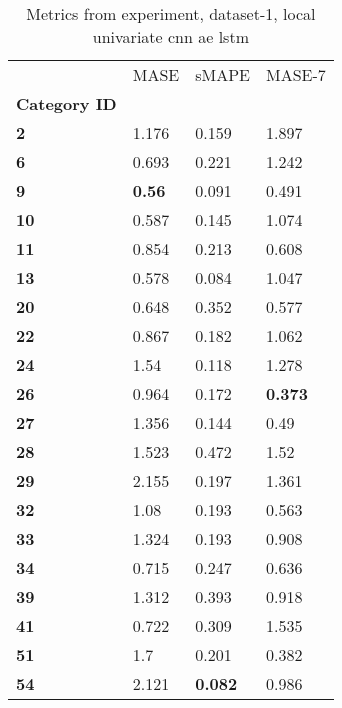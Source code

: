\begin{table}[H]
\centering
\caption{Metrics from experiment, dataset-1, local univariate cnn ae lstm}
\label{table:local-univariate-cnn-ae-lstm-dataset-1}
\begin{tabular}{llll}
\toprule
{} &           MASE &           sMAPE &          MASE-7 \\
\textbf{Category ID} &                &                 &                 \\
\midrule
\textbf{2          } &          1.176 &           0.159 &           1.897 \\
\textbf{6          } &          0.693 &           0.221 &           1.242 \\
\textbf{9          } &  \textbf{0.56} &           0.091 &           0.491 \\
\textbf{10         } &          0.587 &           0.145 &           1.074 \\
\textbf{11         } &          0.854 &           0.213 &           0.608 \\
\textbf{13         } &          0.578 &           0.084 &           1.047 \\
\textbf{20         } &          0.648 &           0.352 &           0.577 \\
\textbf{22         } &          0.867 &           0.182 &           1.062 \\
\textbf{24         } &           1.54 &           0.118 &           1.278 \\
\textbf{26         } &          0.964 &           0.172 &  \textbf{0.373} \\
\textbf{27         } &          1.356 &           0.144 &            0.49 \\
\textbf{28         } &          1.523 &           0.472 &            1.52 \\
\textbf{29         } &          2.155 &           0.197 &           1.361 \\
\textbf{32         } &           1.08 &           0.193 &           0.563 \\
\textbf{33         } &          1.324 &           0.193 &           0.908 \\
\textbf{34         } &          0.715 &           0.247 &           0.636 \\
\textbf{39         } &          1.312 &           0.393 &           0.918 \\
\textbf{41         } &          0.722 &           0.309 &           1.535 \\
\textbf{51         } &            1.7 &           0.201 &           0.382 \\
\textbf{54         } &          2.121 &  \textbf{0.082} &           0.986 \\
\bottomrule
\end{tabular}
\end{table}
